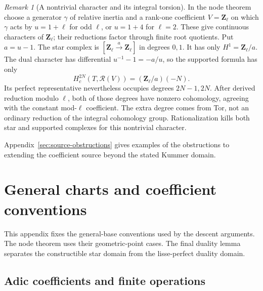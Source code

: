 \documentclass[11pt]{article}
\theoremstyle{definition}
\theoremstyle{remark}
\newtheorem{remark}[theorem]{Remark}
\begin{document}
\begin{remark}[A nontrivial character and its integral torsion]
\label{rem:frag-node-nontrivial-character-test}
In the node theorem choose a generator $\gamma$ of relative inertia
and a rank-one coefficient $V=\mathbf Z_\ell$ on which $\gamma$ acts
by $u=1+\ell$ for odd $\ell$, or $u=1+4$ for $\ell=2$.
These give continuous characters of $\mathbf Z_\ell$; their reductions
factor through finite root quotients.  Put $a=u-1$.  The star complex
is $[\mathbf Z_\ell\xrightarrow{a}\mathbf Z_\ell]$ in degrees $0,1$.
It has only $H^1=\mathbf Z_\ell/a$.  The dual character has differential
$u^{-1}-1=-a/u$, so the supported formula has only
\[
 H^{2N}_c(T,\mathcal R(V))=(\mathbf Z_\ell/a)(-N).
\]
Its perfect representative nevertheless occupies degrees $2N-1,2N$.
After derived reduction modulo $\ell$, both of those degrees have
nonzero cohomology, agreeing with the constant mod-$\ell$ coefficient.
The extra degree comes from Tor, not an ordinary reduction of the
integral cohomology group.  Rationalization kills both star and
supported complexes for this nontrivial character.  \end{remark}


Appendix~\ref{sec:source-obstructions} gives examples of the obstructions
to extending the coefficient source beyond the stated Kummer domain.

\appendix
\section{General charts and coefficient conventions}
\label{sec:frag-chart-coeff}

This appendix fixes the general-base conventions used by the descent
arguments.  The node theorem uses their geometric-point cases.
The final duality lemma separates the constructible star domain
from the lisse-perfect duality domain.

\subsection{Adic coefficients and finite operations}
\end{document}
